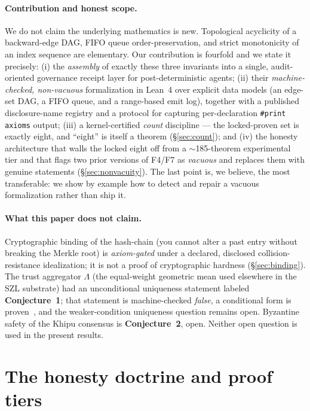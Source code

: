 \documentclass[11pt,letterpaper]{article}
\theoremstyle{definition}
\begin{document}
\paragraph{Contribution and honest scope.} We do not claim the underlying
mathematics is new. Topological acyclicity of a backward-edge DAG, FIFO
queue order-preservation, and strict monotonicity of an index sequence are
elementary. Our contribution is fourfold and we state it precisely:
(i) the \emph{assembly} of exactly these three invariants into a single,
audit-oriented governance receipt layer for post-deterministic agents;
(ii) their \emph{machine-checked, non-vacuous} formalization in Lean~4 over
explicit data models (an edge-set DAG, a FIFO queue, and a range-based emit
log), together with a published disclosure-name registry and a protocol for
capturing per-declaration \texttt{\#print axioms} output;
(iii) a kernel-certified \emph{count} discipline --- the locked-proven set is
exactly eight, and ``eight'' is itself a theorem (\S\ref{sec:count}); and
(iv) the honesty architecture that walls the locked eight off from a
$\sim$185-theorem experimental tier and that flags two prior versions of F4/F7
as \emph{vacuous} and replaces them with genuine statements
(\S\ref{sec:nonvacuity}). The last point is, we believe, the most transferable:
we show by example how to detect and repair a vacuous formalization rather than
ship it.

\paragraph{What this paper does not claim.} Cryptographic binding of the
hash-chain (you cannot alter a past entry without breaking the Merkle root) is
\emph{axiom-gated} under a declared, disclosed collision-resistance
idealization; it is not a proof of cryptographic hardness (\S\ref{sec:binding}).
The trust aggregator $\Lambda$ (the equal-weight geometric mean used elsewhere
in the SZL substrate) had an unconditional uniqueness statement labeled
\textbf{Conjecture~1}; that statement is machine-checked \emph{false}, a
conditional form is proven~\cite{ouroboros25}, and the weaker-condition
uniqueness question remains open. Byzantine safety of the Khipu consensus is
\textbf{Conjecture~2}, open. Neither open question is used in the present
results.

\section{The honesty doctrine and proof tiers}\label{sec:doctrine}
\end{document}

